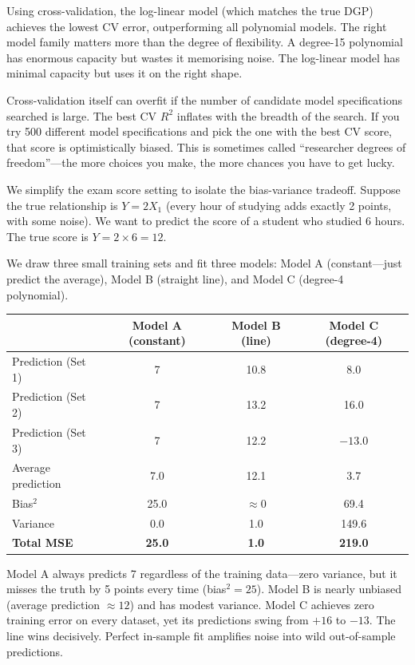 \documentclass[11pt,a4paper]{article}
\theoremstyle{definition}
\theoremstyle{plain}
\theoremstyle{remark}
\begin{document}
\begin{repairbox}
Using cross-validation, the log-linear model (which matches the true DGP) achieves the lowest CV error, outperforming all polynomial models.
The right model family matters more than the degree of flexibility. A degree-15 polynomial has enormous capacity but wastes it memorising noise. The log-linear model has minimal capacity but uses it on the right shape.
\end{repairbox}

\begin{warningbox}
Cross-validation itself can overfit if the number of candidate model specifications searched is large.
The best CV $R^2$ inflates with the breadth of the search. If you try 500 different model specifications and pick the one with the best CV score, that score is optimistically biased. This is sometimes called ``researcher degrees of freedom''---the more choices you make, the more chances you have to get lucky.
\end{warningbox}

\begin{numermark}[title={Three Models, Three Training Sets}]
We simplify the exam score setting to isolate the bias-variance tradeoff. Suppose the true relationship is $Y = 2X_1$ (every hour of studying adds exactly 2 points, with some noise). We want to predict the score of a student who studied 6 hours. The true score is $Y = 2 \times 6 = 12$.

We draw three small training sets and fit three models: Model A (constant---just predict the average), Model B (straight line), and Model C (degree-4 polynomial).

\begin{center}
\begin{tabular}{@{}lccc@{}}
\toprule
& \textbf{Model A} (constant) & \textbf{Model B} (line) & \textbf{Model C} (degree-4) \\
\midrule
Prediction (Set 1) & 7 & 10.8 & 8.0 \\
Prediction (Set 2) & 7 & 13.2 & 16.0 \\
Prediction (Set 3) & 7 & 12.2 & $-13.0$ \\
\midrule
Average prediction & 7.0 & 12.1 & 3.7 \\
Bias$^2$ & 25.0 & $\approx 0$ & 69.4 \\
Variance & 0.0 & 1.0 & 149.6 \\
\textbf{Total MSE} & \textbf{25.0} & \textbf{1.0} & \textbf{219.0} \\
\bottomrule
\end{tabular}
\end{center}

Model A always predicts 7 regardless of the training data---zero variance, but it misses the truth by 5 points every time (bias$^2 = 25$). Model B is nearly unbiased (average prediction $\approx 12$) and has modest variance. Model C achieves zero training error on every dataset, yet its predictions swing from $+16$ to $-13$. The line wins decisively. Perfect in-sample fit amplifies noise into wild out-of-sample predictions.
\end{numermark}
\end{document}
